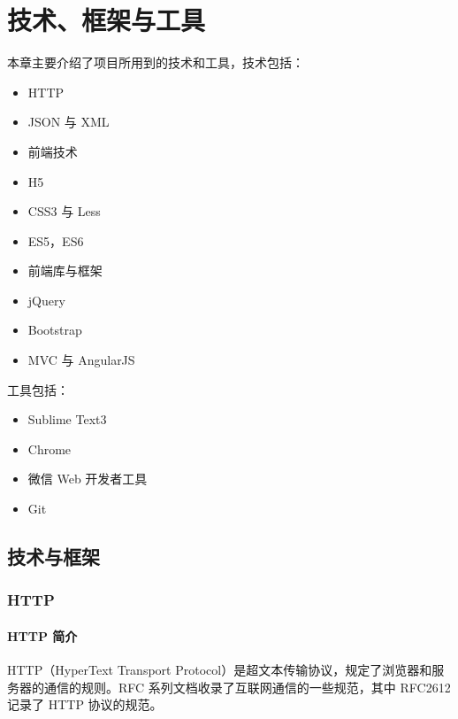 \documentclass[UTF8]{ctexbook}
\begin{document}
  \chapter{技术、框架与工具}
    \label{chap:技术与工具}
      本章主要介绍了项目所用到的技术和工具，技术包括：
      \begin{itemize}
        \item HTTP
        \item JSON 与 XML
        \item 前端技术
        \item H5
        \item CSS3 与 Less
        \item ES5，ES6
        \item 前端库与框架
        \item jQuery
        \item Bootstrap
        \item MVC 与 AngularJS
      \end{itemize}

      工具包括：

      \begin{itemize}
        \item Sublime Text3
        \item Chrome
        \item 微信 Web 开发者工具
        \item Git
      \end{itemize}

    \section{技术与框架}
      \label{sec:技术框架}

        \subsection{HTTP}
          \label{subsec:http}
            \subsubsection{HTTP 简介}
              \label{subsubsec:http_简介}
                HTTP（HyperText Transport Protocol）是超文本传输协议，规定了浏览器和服务器的通信的规则。RFC 系列文档收录了互联网通信的一些规范，其中 RFC2612 记录了 HTTP 协议的规范。
\end{document}
